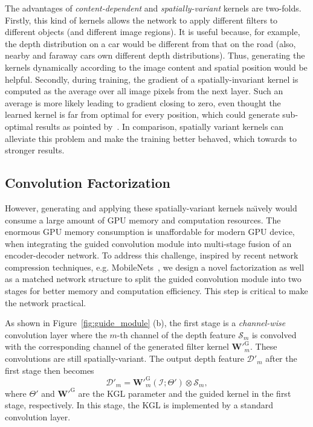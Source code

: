 \documentclass[journal]{IEEEtran}
\begin{document}
The advantages of \emph{content-dependent} and \emph{spatially-variant} kernels are two-folds.
Firstly, this kind of kernels allows the network to apply different filters to different objects (and different image regions).
It is useful because, for example, the depth distribution on a car would be different from that on the road (also, nearby and faraway cars own different depth distributions).
Thus, generating the kernels dynamically according to the image content and spatial position would be helpful. 
Secondly, during training, the gradient of a spatially-invariant kernel is computed as the average over all image pixels from the next layer.
Such an average is more likely leading to gradient closing to zero, even thought the learned kernel is far from optimal for every position,
which could generate sub-optimal results as pointed by~\cite{large_dynamic_filter}.
In comparison, spatially variant kernels can alleviate this problem and make the training better behaved, which towards to stronger results. 



\subsection{Convolution Factorization}
\label{subsec:conv_fact} 

However, generating and applying these spatially-variant kernels na\"{\i}vely would consume a large amount of GPU memory and computation resources.
The enormous GPU memory consumption is unaffordable for modern GPU device, 
when integrating the guided convolution module into multi-stage fusion of an encoder-decoder network.
To address this challenge, inspired by recent network compression techniques, e.g. MobileNets~\cite{MobileNets},
we design a novel factorization as well as a matched network structure to split the guided convolution module into two stages for better memory and computation efficiency.
This step is critical to make the network practical.

As shown in Figure~\ref{fig:guide_module} (b), the first stage is a \emph{channel-wise} convolution layer
where the $m$-th channel of the depth feature $\mathcal{S}_m$ is convolved with the corresponding channel of the generated filter kernel $\mathbf{W'}^\mathrm{G}_{m}$.
These convolutions are still spatially-variant. The output depth feature $\mathcal{D}'_m$ after the first stage then becomes
\begin{equation}
   \label{eq:conv_fact1}
      \mathcal{D}'_m = \mathbf{W'}^{\mathrm{G}}_m(\mathcal{I};\Theta') \otimes \mathcal{S}_m,
\end{equation}
where $\Theta'$ and $\mathbf{W'}^{\mathrm{G}}$ are the KGL parameter and the guided kernel in the first stage, respectively.
In this stage, the KGL is implemented by a standard convolution layer. 
\end{document}
